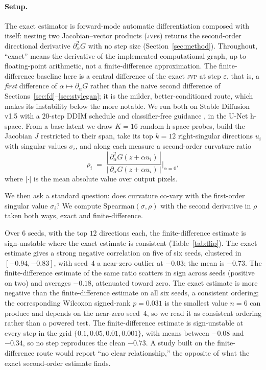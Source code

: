 \documentclass[10pt]{article} %
\newcommand{\jvp}{\textsc{jvp}}
\newcommand{\eps}{\varepsilon}
\begin{document}
\paragraph{Setup.} The exact estimator is forward-mode automatic differentiation
composed with itself: nesting two Jacobian--vector products (\jvp{}s) returns the
second-order directional derivative $\partial^2_\alpha G$ with no step size
(Section~\ref{sec:method}). Throughout, ``exact'' means the derivative of the
implemented computational graph, up to floating-point arithmetic, not a
finite-difference approximation. The finite-difference baseline here is a central
difference of the exact \jvp{} at step $\eps$, that is, a \emph{first} difference of
$\alpha\mapsto\partial_\alpha G$ rather than the naive second difference of
Sections~\ref{sec:fd}--\ref{sec:stylegan}; it is the milder, better-conditioned
route, which makes its instability below the more notable. We run both on Stable
Diffusion v1.5 \citep{rombach2022} with a $20$-step DDIM schedule
\citep{song2021ddim} and classifier-free guidance \citep{ho2022cfg}, in the U-Net
h-space. From a base latent we draw $K{=}16$ random h-space probes, build the
Jacobian $J$ restricted to their span, take its top $k{=}12$ right-singular
directions $u_i$ with singular values $\sigma_i$, and along each measure a
second-order curvature ratio
\[
\rho_i \;=\; \frac{|\,\partial^2_\alpha G(z+\alpha u_i)\,|}{|\,\partial_\alpha
G(z+\alpha u_i)\,|}\Bigg|_{\alpha=0},
\]
where $|\cdot|$ is the mean absolute value over output pixels.

We then ask a standard question: does curvature co-vary with the first-order
singular value $\sigma_i$? We compute Spearman$(\sigma,\rho)$ with the second
derivative in $\rho$ taken both ways, exact and finite-difference.

Over $6$ seeds, with the top $12$ directions each, the finite-difference estimate
is sign-unstable where the exact estimate is consistent (Table~\ref{tab:flip}). The
exact estimate gives a strong negative correlation on five of six seeds, clustered
in $[-0.94,-0.83]$, with seed~4 a near-zero outlier at $-0.03$; the mean is $-0.73$.
The finite-difference estimate of the same ratio scatters in sign across seeds
(positive on two) and averages $-0.18$, attenuated toward zero. The exact estimate
is more negative than the finite-difference estimate on all six seeds, a consistent
ordering; the corresponding Wilcoxon signed-rank $p=0.031$ is the smallest value
$n{=}6$ can produce and depends on the near-zero seed~4, so we read it as
consistent ordering rather than a powered test. The finite-difference estimate is
sign-unstable at every step in the grid $\{0.1,0.05,0.01,0.001\}$, with means
between $-0.08$ and $-0.34$, so no step reproduces the clean $-0.73$. A study built
on the finite-difference route would report ``no clear relationship,'' the opposite
of what the exact second-order estimate finds.
\end{document}
